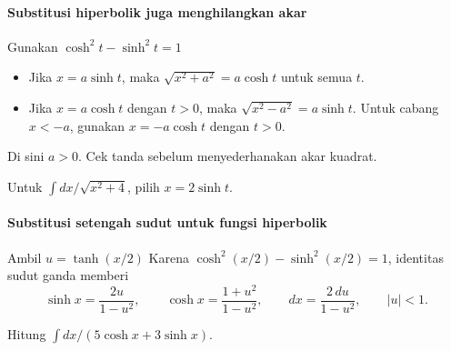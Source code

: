 \documentclass{../../kalkulus-ppt}
\begin{document}
\begin{frame}{\insertsection}
    \framesubtitle{Substitusi hiperbolik juga menghilangkan akar}
    \begin{block}{Gunakan $\cosh^2t-\sinh^2t=1$}
        \begin{itemize}
            \item Jika $x=a\sinh t$, maka $\sqrt{x^2+a^2}=a\cosh t$ untuk semua $t$.
            \item Jika $x=a\cosh t$ dengan $t>0$, maka $\sqrt{x^2-a^2}=a\sinh t$.
                Untuk cabang $x<-a$, gunakan $x=-a\cosh t$ dengan $t>0$.
        \end{itemize}
        Di sini $a>0$. Cek tanda sebelum menyederhanakan akar kuadrat.
    \end{block}
    \begin{contoh}
        Untuk $\int dx/\sqrt{x^2+4}$, pilih $x=2\sinh t$.
    \end{contoh}
\end{frame}

\begin{frame}{\insertsection}
    \framesubtitle{Substitusi setengah sudut untuk fungsi hiperbolik}
    \begin{block}{Ambil $u=\tanh(x/2)$}
        Karena $\cosh^2(x/2)-\sinh^2(x/2)=1$, identitas sudut ganda memberi
        \[
            \sinh x=\frac{2u}{1-u^2},\qquad
            \cosh x=\frac{1+u^2}{1-u^2},\qquad
            dx=\frac{2\,du}{1-u^2},\qquad |u|<1.
        \]
    \end{block}
    \begin{contoh}
        Hitung $\int dx/(5\cosh x+3\sinh x)$.
    \end{contoh}
\end{frame}
\end{document}
